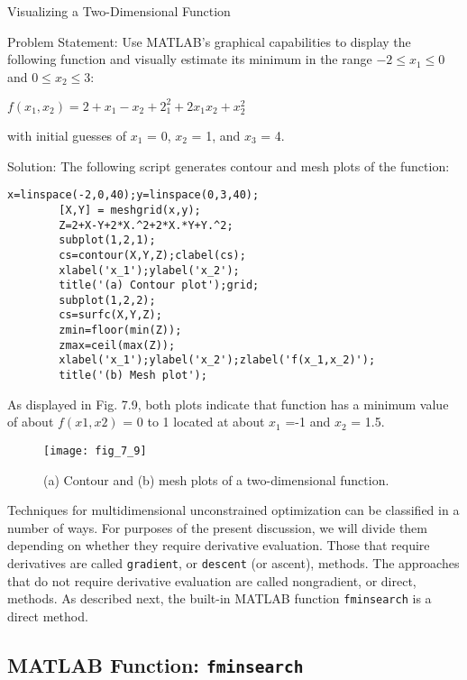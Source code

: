 \documentclass[../main.tex]{subfiles}
\begin{document}
\begin{example}
	Visualizing a Two-Dimensional Function
	\smallskip
	
	\noindent Problem Statement:
	Use MATLAB's graphical capabilities to display the following
	function and visually estimate its minimum in the range $-2 \le x_1 \le 0$ and $0 \le x_2 \le 3$:

	$ f(x_1,x_2) = 2 + x_1 - x_2 + 2_1^2 + 2x_1x_2 + x_2^2$
	\medskip
	
	with initial guesses of $x_1$ = 0, $x_2$ = 1, and $x_3$ = 4.

	\noindent Solution: The following script generates contour and mesh plots of the function:
	\medskip

	\begin{lstlisting}[numbers=none,frame=none]
		x=linspace(-2,0,40);y=linspace(0,3,40);
		[X,Y] = meshgrid(x,y);
		Z=2+X-Y+2*X.^2+2*X.*Y+Y.^2;
		subplot(1,2,1);
		cs=contour(X,Y,Z);clabel(cs);
		xlabel('x_1');ylabel('x_2');
		title('(a) Contour plot');grid;
		subplot(1,2,2);
		cs=surfc(X,Y,Z);
		zmin=floor(min(Z));
		zmax=ceil(max(Z));
		xlabel('x_1');ylabel('x_2');zlabel('f(x_1,x_2)');
		title('(b) Mesh plot');
	\end{lstlisting}

	\noindent As displayed in Fig. 7.9, both plots indicate that function has a minimum value of about
	$f(x1, x2)$ = 0 to 1 located at about $x_1$ =-1 and $x_2$ = 1.5.

	\begin{figure}[H]
		\centering
		\texttt{[image: fig\_7\_9]}
		\caption{\textsf{(a) Contour and (b) mesh plots of a two-dimensional function.}}
		\label{fig:fig_7_9}
	\end{figure}
\end{example}

Techniques for multidimensional unconstrained optimization can be classified in a
number of ways. For purposes of the present discussion, we will divide them depending
on whether they require derivative evaluation. Those that require derivatives are called
\texttt{gradient}, or \texttt{descent} (or ascent), methods. The approaches that do not require derivative evaluation
are called nongradient, or direct, methods. As described next, the built-in MATLAB
function \texttt{fminsearch} is a direct method.

\subsection{MATLAB Function: \texttt{fminsearch}}
\end{document}
